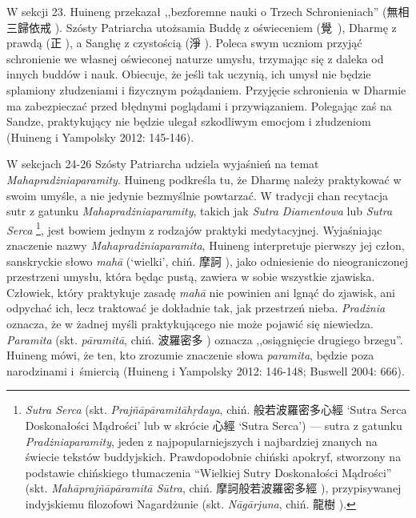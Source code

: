 W sekcji 23. Huineng przekazał ,,bezforemne nauki o Trzech Schronieniach\fnm'' (無相三歸依戒 ).
Szósty Patriarcha utożsamia Buddę z oświeceniem (覺~), Dharmę z prawdą (正 ), a Sanghę z czystością (淨 ).
Poleca swym uczniom przyjąć schronienie we własnej oświeconej naturze umysłu, trzymając się z daleka od innych buddów i nauk.
Obiecuje, że jeśli tak uczynią, ich umysł nie będzie splamiony złudzeniami i fizycznym pożądaniem.
Przyjęcie schronienia w Dharmie ma zabezpieczać przed błędnymi poglądami i przywiązaniem.
Polegając zaś na Sandze, praktykujący nie będzie ulegał szkodliwym emocjom i złudzeniom %
(Huineng i Yampolsky 2012: 145-146).

W sekcjach 24-26 Szósty Patriarcha udziela wyjaśnień na temat \textit{Mahapradżniaparamity}.
Huineng podkreśla tu, że Dharmę należy praktykować w swoim umyśle, a nie jedynie bezmyślnie powtarzać.
W tradycji chan recytacja sutr z gatunku \textit{Mahapradżniaparamity}, takich jak \textit{Sutra Diamentowa} lub \textit{Sutra Serca}%
\footnote{\textit{Sutra Serca}\label{HeartSutra} (skt. \textit{Prajñāpāramitāh\d{r}daya}, chiń. 般若波羅密多心經  `Sutra Serca Doskonałości Mądrości' lub w skrócie 心經  `Sutra Serca') --- sutra z gatunku \textit{Pradżniaparamity}, jeden z najpopularniejszych i najbardziej znanych na świecie tekstów buddyjskich. Prawdopodobnie chiński apokryf, stworzony na podstawie chińskiego tłumaczenia ``Wielkiej Sutry Doskonałości Mądrości'' (skt. \textit{Mahāprajñāpāramitā Sūtra}, chiń. 摩訶般若波羅密多經 ), przypisywanej indyjskiemu filozofowi Nagardżunie (skt. \textit{Nāgārjuna}, chiń. 龍樹 ).},
jest bowiem jednym z rodzajów praktyki medytacyjnej.
Wyjaśniając znaczenie nazwy \textit{Mahapradżniaparamita}, Huineng interpretuje pierwszy jej człon, sanskryckie słowo \textit{mahā} (`wielki', chiń. 摩訶 ), jako odniesienie do nieograniczonej przestrzeni umysłu, która będąc pustą, zawiera w sobie wszystkie zjawiska.
Człowiek, który praktykuje zasadę \textit{mahā} nie powinien ani lgnąć do zjawisk, ani odpychać ich, lecz traktować je dokładnie tak, jak przestrzeń nieba.
\textit{Pradżnia} oznacza, że w żadnej myśli praktykującego nie może pojawić się niewiedza.
\textit{Paramita} (skt. \textit{pāramitā}, chiń. 波羅密多 ) oznacza ,,osiągnięcie drugiego brzegu''.
Huineng mówi, że ten, kto zrozumie znaczenie słowa \textit{paramita}, będzie poza narodzinami i~śmiercią
(Huineng i Yampolsky 2012: 146-148; Buswell 2004: 666).

